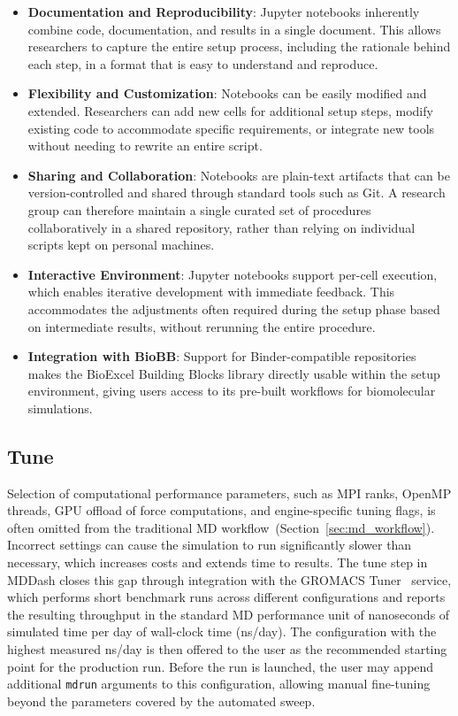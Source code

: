 \documentclass[
  digital,     %
  color,       %
  oneside,     %
  nosansbold,  %
  nocolorbold, %
  lof,         %
  lot,         %
]{fithesis4}
\begin{document}
\begin{itemize}
    \item \textbf{Documentation and Reproducibility}: Jupyter notebooks inherently combine code, documentation, and results in a single document. This allows researchers to capture the entire setup process, including the rationale behind each step, in a format that is easy to understand and reproduce.
    \item \textbf{Flexibility and Customization}: Notebooks can be easily modified and extended. Researchers can add new cells for additional setup steps, modify existing code to accommodate specific requirements, or integrate new tools without needing to rewrite an entire script.
    \item \textbf{Sharing and Collaboration}: Notebooks are plain-text artifacts that can be version-controlled and shared through standard tools such as Git. A research group can therefore maintain a single curated set of procedures collaboratively in a shared repository, rather than relying on individual scripts kept on personal machines.
    \item \textbf{Interactive Environment}: Jupyter notebooks support per-cell execution, which enables iterative development with immediate feedback. This accommodates the adjustments often required during the setup phase based on intermediate results, without rerunning the entire procedure.
    \item \textbf{Integration with BioBB}: Support for Binder-compatible repositories makes the BioExcel Building Blocks library directly usable within the setup environment, giving users access to its pre-built workflows for biomolecular simulations.
\end{itemize}

\subsection{Tune}
\label{sec:step_tune}

Selection of computational performance parameters, such as MPI ranks, OpenMP threads, GPU offload of force computations, and engine-specific tuning flags, is often omitted from the traditional MD workflow~(Section~\ref{sec:md_workflow}). Incorrect settings can cause the simulation to run significantly slower than necessary, which increases costs and extends time to results. The tune step in MDDash closes this gap through integration with the GROMACS Tuner~\cite{gromacs_tuner} service, which performs short benchmark runs across different configurations and reports the resulting throughput in the standard MD performance unit of nanoseconds of simulated time per day of wall-clock time (ns/day). The configuration with the highest measured ns/day is then offered to the user as the recommended starting point for the production run. Before the run is launched, the user may append additional \texttt{mdrun} arguments to this configuration, allowing manual fine-tuning beyond the parameters covered by the automated sweep.
\end{document}
